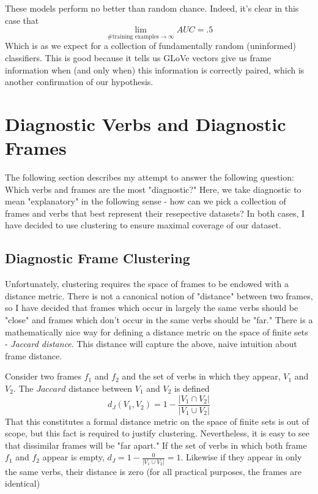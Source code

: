 \documentclass[a4paper]{article}
\begin{document}
These models perform no better than random chance. Indeed, it's clear in this case that 
\[  \lim_{\# \text{training examples} \rightarrow \infty} AUC = .5 \]
Which is as we expect for a collection of fundamentally random (uninformed) classifiers. This is good because it tells us GLoVe vectors give us frame information when (and only when) this information is correctly paired, which is another confirmation of our hypothesis.

\section{Diagnostic Verbs and Diagnostic Frames}

The following section describes my attempt to answer the following question: Which verbs and frames are the most "diagnostic?" Here, we take diagnostic to mean "explanatory" in the following sense - how can we pick a collection of frames and verbs that best represent their resepective datasets? In both cases, I have decided to use clustering to ensure maximal coverage of our dataset.

\subsection{Diagnostic Frame Clustering}

Unfortunately, clustering requires the space of frames to be endowed with a distance metric. There is not a canonical notion of "distance" between two frames, so I have decided that frames which occur in largely the same verbs should be "close" and frames which don't occur in the same verbs should be "far." There is a mathematically nice way for defining a distance metric on the space of finite sets - \textit{Jaccard distance}. This distance will capture the above, naive intuition about frame distance.

Consider two frames $f_1$ and $f_2$ and the set of verbs in which they appear, $V_1$ and $V_2$. The $\textit{Jaccard}$ distance between $V_1$ and $V_2$ is defined
\[ d_J(V_1, V_2) =  1 - \frac{|V_1 \cap V_2|}{|V_1 \cup V_2|} \]
That this constitutes a formal distance metric on the space of finite sets is out of scope, but this fact is required to justify clustering. Nevertheless, it is easy to see that dissimilar frames will be "far apart." If the set of verbs in which both frame $f_1$ and $f_2$ appear is empty,  $d_J = 1 - \frac{0}{|V_1 \cup V_2|} = 1$. Likewise if they appear in only the same verbs, their distance is zero (for all practical purposes, the frames are identical)
\end{document}
